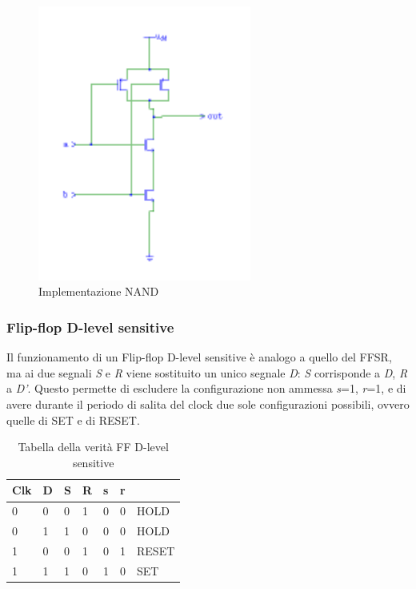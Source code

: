 \documentclass[10pt]{article}
\begin{document}
\begin{itemize}
    \begin{figure}[ht]
    \begin{minipage}[b]{0.4\textwidth}
    \centering
    \includegraphics[width=70mm]{nand}
    \caption{Implementazione NAND}
    \label{ }
    \end{minipage}
    \end{figure}

\subsubsection{Flip-flop D-level sensitive}
Il funzionamento di un Flip-flop D-level sensitive è analogo a quello del FFSR, ma ai due segnali \emph{S} e \emph{R} viene sostituito un unico segnale \emph{D}: 
\emph{S} corrisponde a \emph{D}, \emph{R} a \emph{D'}. Questo permette di escludere la configurazione non ammessa \emph{s}=1, \emph{r}=1, 
e di avere durante il periodo di salita del clock due sole configurazioni possibili, ovvero quelle di SET e di RESET. 

\begin{table}[H]
    \begin{minipage}[b]{0.4\textwidth}
    \centering
    \begin{tabular}{|ll|ll|ll|l|}
        \hline
        \textbf{Clk} & \textbf{D} & \textbf{S} & \textbf{R} & \textbf{s} & \textbf{r} &       \\ \hline
        0            & 0          & 0          & 1          & 0          & 0          & HOLD  \\ 
        0            & 1          & 1          & 0          & 0          & 0          & HOLD  \\ 
        1            & 0          & 0          & 1          & 0          & 1          & RESET \\ 
        1            & 1          & 1          & 0          & 1          & 0          & SET   \\ \hline
        \end{tabular}
        \caption{Tabella della verità FF D-level sensitive}
        \label{tab:my-table}
    \end{minipage}
    \end{table}
    

\end{itemize}
\end{document}
